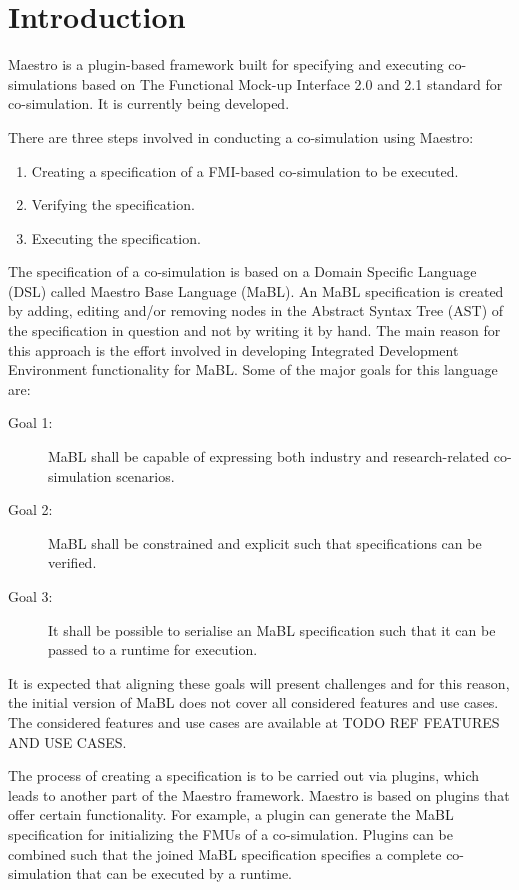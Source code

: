 \section{Introduction}\label{sec:intro}
Maestro is a plugin-based framework built for specifying and executing co-simulations based
on The Functional Mock-up Interface 2.0 and 2.1 standard for co-simulation. It
is currently being developed.

There are three steps involved in conducting a co-simulation using Maestro:
\begin{enumerate}
  \item Creating a specification of a FMI-based co-simulation to be executed.
  \item Verifying the specification.
  \item Executing the specification.
\end{enumerate}

The specification of a co-simulation is based on a Domain Specific Language (DSL) called Maestro
Base Language (MaBL). An MaBL specification is created by adding, editing and/or
removing nodes in the Abstract Syntax Tree (AST) of the specification in question and not by
writing it by hand. The main
reason for this approach is the effort involved in developing Integrated Development
Environment functionality for MaBL. Some of the major goals for this language are:
\begin{description}
  \item[Goal 1:] MaBL shall be capable of expressing both industry and
    research-related co-simulation scenarios.
  \item[Goal 2:] MaBL shall be constrained and explicit such that specifications can be
    verified.
    \item[Goal 3:] It shall be possible to serialise an MaBL specification such
    that it can be passed to a runtime for execution.
\end{description}
It is expected that aligning these goals will present challenges and for this
reason, the initial version of MaBL does not cover all considered features and
use cases. The considered features and use cases are available at TODO REF
FEATURES AND USE CASES.

The process of creating a specification is to be carried out via plugins, which
leads to another part of the Maestro framework. Maestro is based on plugins that
offer certain functionality. For example, a plugin can generate the MaBL
specification for initializing the FMUs of a co-simulation. Plugins can be
combined such that the joined MaBL specification specifies a complete
co-simulation that can be executed by a runtime.

